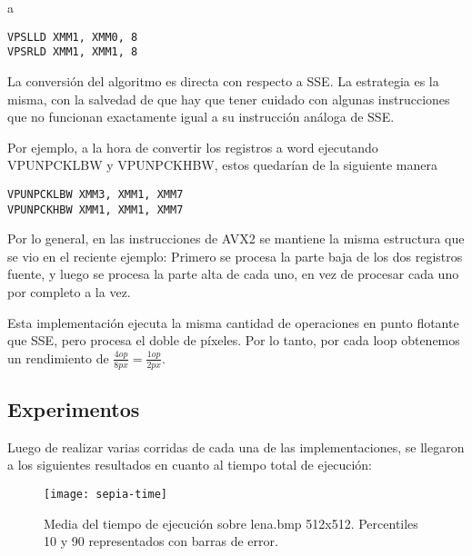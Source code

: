 a

\begin{lstlisting}
VPSLLD XMM1, XMM0, 8
VPSRLD XMM1, XMM1, 8
\end{lstlisting}


La conversión del algoritmo es directa con respecto a SSE. La estrategia es la misma, con la salvedad de que hay que tener cuidado con algunas instrucciones que no funcionan exactamente igual a su instrucción análoga de SSE.

Por ejemplo, a la hora de convertir los registros a word ejecutando VPUNPCKLBW y VPUNPCKHBW, estos quedarían de la siguiente manera

\begin{lstlisting}
VPUNPCKLBW XMM3, XMM1, XMM7
VPUNPCKHBW XMM1, XMM1, XMM7
\end{lstlisting}

 

 

Por lo general, en las instrucciones de AVX2 se mantiene la misma estructura que se vio en el reciente ejemplo: Primero se procesa la parte baja de los dos registros fuente, y luego se procesa la parte alta de cada uno, en vez de procesar cada uno por completo a la vez.

Esta implementación ejecuta la misma cantidad de operaciones en punto flotante que SSE, pero procesa el doble de píxeles. Por lo tanto, por cada loop obtenemos un rendimiento de $\frac{4op}{8px} = \frac{1op}{2px}$.


\subsection{Experimentos}

 Luego de realizar varias corridas de cada una de las implementaciones, se llegaron a los siguientes resultados en cuanto al tiempo total de ejecución:

\begin{figure}[h]
    \centering
    \texttt{[image: sepia-time]}
    \caption{Media del tiempo de ejecución sobre lena.bmp 512x512. Percentiles 10 y 90 representados con barras de error.}
    \label{fig:sepia-time}
\end{figure}

